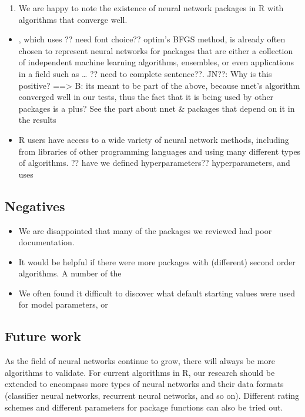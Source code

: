 \begin{enumerate}
\def\labelenumi{\arabic{enumi}.}
\tightlist
\item
  We are happy to note the existence of neural network packages in R
  with algorithms that converge well.
\end{enumerate}

\begin{itemize}
\tightlist
\item
  , which uses ?? need font choice?? optim's BFGS method, is
  already often chosen to represent neural networks for packages that
  are either a collection of independent machine learning algorithms,
  ensembles, or even applications in a field such as \ldots{} ?? need to
  complete sentence??. JN??: Why is this positive? ==\textgreater{} B:
  its meant to be part of the above, because nnet's algorithm converged
  well in our tests, thus the fact that it is being used by other
  packages is a plus? See the part about nnet \& packages that depend on
  it in the results
\item
  R users have access to a wide variety of neural network methods,
  including from libraries of other programming languages and using many
  different types of algorithms. ?? have we defined hyperparameters??
  hyperparameters, and uses 
\end{itemize}

\hypertarget{negatives}{%
\subsection{Negatives}\label{negatives}}

\begin{itemize}
\tightlist
\item
  We are disappointed that many of the packages we reviewed had poor
  documentation.
\item
  It would be helpful if there were more packages with (different)
  second order algorithms. A number of the 
\item
  We often found it difficult to discover what default starting values
  were used for model parameters, or 
\end{itemize}

\hypertarget{future-work}{%
\subsection{Future work}\label{future-work}}

As the field of neural networks continue to grow, there will always be
more algorithms to validate. For current algorithms in R, our research
should be extended to encompass more types of neural networks and their
data formats (classifier neural networks, recurrent neural networks, and
so on). Different rating schemes and different parameters for package
functions can also be tried out.

